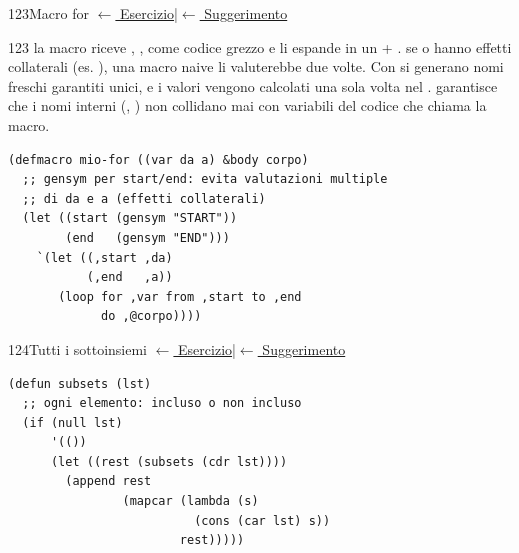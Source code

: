 \label{sol:123}
\begin{solbox}{123}{Macro for}
\small\color{black!55}\hyperref[ex:123]{$\leftarrow$ Esercizio}\enspace\textcolor{black!30}{|}\enspace\hyperref[hint:123]{$\leftarrow$ Suggerimento}\normalsize\color{black}
\begin{ragionamentoBox}{123}
 la macro riceve , ,  come codice
grezzo e li espande in un  + .
 se  o 
hanno effetti collaterali (es. ), una macro naive li
valuterebbe due volte. Con  si generano nomi freschi
garantiti unici, e i valori vengono calcolati una sola volta nel .
  garantisce che i nomi interni
(, ) non collidano mai con variabili
del codice che chiama la macro.
\end{ragionamentoBox}
\begin{lstlisting}
(defmacro mio-for ((var da a) &body corpo)
  ;; gensym per start/end: evita valutazioni multiple
  ;; di da e a (effetti collaterali)
  (let ((start (gensym "START"))
        (end   (gensym "END")))
    `(let ((,start ,da)
           (,end   ,a))
       (loop for ,var from ,start to ,end
             do ,@corpo))))
\end{lstlisting}
\end{solbox}


\label{sol:124}
\begin{solbox}{124}{Tutti i sottoinsiemi}
\small\color{black!55}\hyperref[ex:124]{$\leftarrow$ Esercizio}\enspace\textcolor{black!30}{|}\enspace\hyperref[hint:124]{$\leftarrow$ Suggerimento}\normalsize\color{black}
\begin{lstlisting}
(defun subsets (lst)
  ;; ogni elemento: incluso o non incluso
  (if (null lst)
      '(())
      (let ((rest (subsets (cdr lst))))
        (append rest
                (mapcar (lambda (s)
                          (cons (car lst) s))
                        rest)))))
\end{lstlisting}
\end{solbox}

